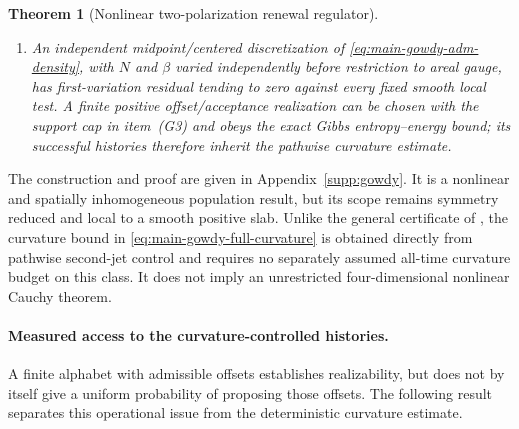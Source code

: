 \documentclass[11pt]{article}
\newtheorem{theorem}{Theorem}[section]
\theoremstyle{definition}
\theoremstyle{remark}
\begin{document}
\begin{theorem}[Nonlinear two-polarization renewal regulator]
\begin{enumerate}[label=\textup{(G\arabic*)},leftmargin=3em]
\begin{equation}
{       +\|D^2g_h-D^2g_*\|_{L^\infty}
       +\|\operatorname{Riem}(g_h)-\operatorname{Riem}(g_*)\|_{L^\infty}
       \le Ch,}
       \label{eq:main-gowdy-full-curvature}
      \end{equation}
      where the first term is in fact $O(h^2)$.  Thus
      $\sup_h\|\operatorname{Riem}(g_h)\|_{L^2(K)}<\infty$ and
      $\|\operatorname{Ric}(g_h)\|_{L^\infty(K)}\le Ch$ pathwise.  The
      Levi--Civita curvature of the limiting metric is therefore identified
      directly.
\item An independent midpoint/centered discretization of
      \eqref{eq:main-gowdy-adm-density}, with $N$ and $\beta$ varied
      independently before restriction to areal gauge, has first-variation
      residual tending to zero against every fixed smooth local test.  A finite
      positive offset/acceptance realization can be chosen with the support cap
      in item~\textup{(G3)} and obeys the exact Gibbs entropy--energy bound; its
      successful histories therefore inherit the pathwise curvature estimate.
\end{enumerate}
\end{theorem}

The construction and proof are given in Appendix~\ref{supp:gowdy}.  It is a
nonlinear and spatially inhomogeneous population result, but its scope remains
symmetry reduced and local to a smooth positive slab.  Unlike the general
certificate of , the curvature bound in
\eqref{eq:main-gowdy-full-curvature} is obtained directly from pathwise
second-jet control and requires no separately assumed all-time curvature budget
on this class.  It does not imply an unrestricted four-dimensional nonlinear
Cauchy theorem.

\paragraph{Measured access to the curvature-controlled histories.}
A finite alphabet with admissible offsets establishes realizability, but does
not by itself give a uniform probability of proposing those offsets.  The
following result separates this operational issue from the deterministic
curvature estimate.
\end{document}
